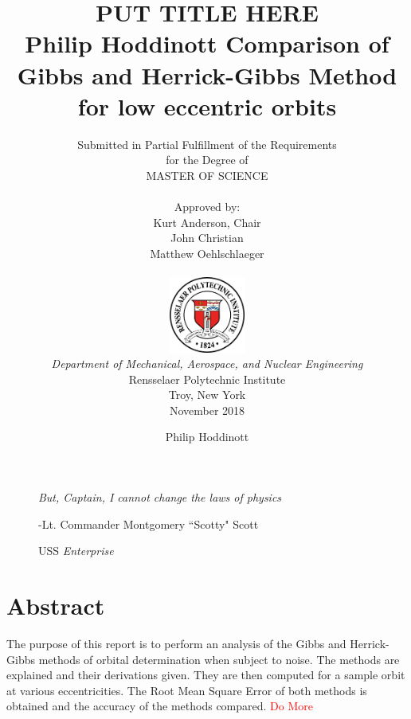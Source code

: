 \documentclass[12pt]{article}
\title{ 
		\LARGE \textbf{\uppercase{Put Title Here}} \\
		\vspace{0.25cm}
		\LARGE \textbf{Philip Hoddinott}
	}
\author{\small{Submitted in Partial Fulfillment of the Requirements} \\ \small{for the Degree of} \\
		\uppercase{Master of Science} \\ \\
		Approved by:
		\\ Kurt Anderson, Chair \\ John Christian \\ Matthew Oehlschlaeger \\ \\ %
		\includegraphics[width=2.5cm]{rensselaer_seal.png} \\
		\small{\textit{Department of Mechanical, Aerospace, and Nuclear Engineering}} \\
		\small{Rensselaer Polytechnic Institute} \\ 
		\small{Troy, New York} \\
		\small{November 2018}
	}
\newlength\longest
\begin{document}
		\title{Comparison of Gibbs and Herrick-Gibbs Method for low eccentric orbits}
	\author{Philip Hoddinott}
	
	\maketitle
	\thispagestyle{empty}
	\clearpage
	
	\thispagestyle{empty}
	\null\vfill
	
	\begin{figure}[!t]
		\begin{center}
			\settowidth{}
			\parbox{\longest}{%
				\raggedright{\huge\itshape%
					But, Captain, I cannot change the laws of physics\par\bigskip
				}   
				\raggedleft\Large{-Lt. Commander Montgomery ``Scotty" Scott}\par
				\raggedleft\Large{USS}\textit{ Enterprise}\par%
				
			}
		\end{center}
	\end{figure}
	
	
	\null\vfill
	
	\newpage
	\tableofcontents
	
	\newpage


	
	\listoffigures
	
	\newpage
		\doublespacing

	
	
	\newpage
	\section{Abstract}
	The purpose of this report is to perform an analysis of the Gibbs and Herrick-Gibbs methods of orbital determination when subject to noise. The methods are explained and their derivations given. They are then computed for a sample orbit at various eccentricities. The Root Mean Square Error of both methods is obtained and the accuracy of the methods compared. 
	\textcolor{red}{ Do More}
	\newpage
\end{document}

